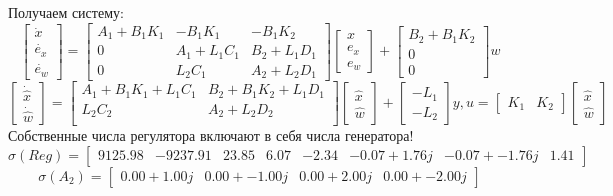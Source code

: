 Получаем систему:
\[
    \begin{bmatrix}
        \dot{x} \\
        \dot{e_x} \\
        \dot{e_w}
    \end{bmatrix} = 
    \begin{bmatrix}
        A_1 + B_1K_1 & -B_1K_1 & -B_1K_2 \\
        0 & A_1 + L_1C_1 & B_2 + L_1 D_1 \\
        0 & L_2 C_1 & A_2 + L_2 D_1
    \end{bmatrix}
    \begin{bmatrix}
        x \\
        e_x \\
        e_w
    \end{bmatrix} 
    + 
    \begin{bmatrix}
        B_2 + B_1 K_2 \\
        0 \\
        0
    \end{bmatrix} w
\]
\[
    \begin{bmatrix}
        \dot{\hat{x}} \\
        \dot{\hat{w}}
    \end{bmatrix} = 
    \begin{bmatrix}
        A_1 + B_1K_1 + L_1C_1 & B_2 + B_1K_2 + L_1D_1 \\
        L_2C_2 & A_2 + L_2D_2 \\
    \end{bmatrix}
    \begin{bmatrix}
        \hat{x} \\
        \hat{w}
    \end{bmatrix}
    +
    \begin{bmatrix}
        -L_1 \\ -L_2 
    \end{bmatrix}y, u = \begin{bmatrix}
        K_1 & K_2 
    \end{bmatrix}\begin{bmatrix}
        {\hat{x}} \\ {\hat{w}} 
    \end{bmatrix}
\]
Собственные числа регулятора включают в себя числа генератора!
\[\sigma (Reg) = \begin{bmatrix}
    9125.98 & -9237.91 &  23.85 &  6.07 & -2.34 & -0.07 + 1.76j & -0.07 + -1.76j &  1.41
  \end{bmatrix}\]
  \[\sigma (A_2) = \begin{bmatrix}
    0.00 + 1.00j &  0.00 + -1.00j &  0.00 + 2.00j &  0.00 + -2.00j
  \end{bmatrix}\]

